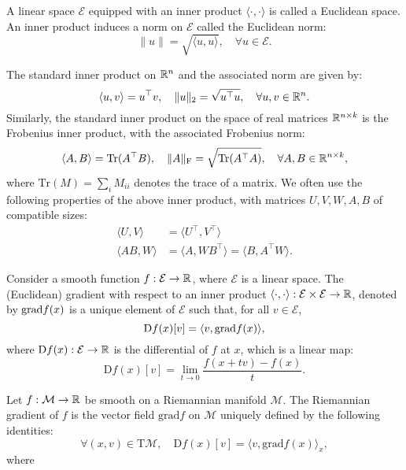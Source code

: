 \begin{definition}
    A linear space $\mathcal{E}$ equipped with an inner product $\langle \cdot, \cdot \rangle$ is called a Euclidean space. An inner product induces a norm on $\mathcal{E}$ called the Euclidean norm:
    \[
        \lVert u \rVert = \sqrt{\langle u, u \rangle}, \quad \forall u \in \mathcal{E}.
    \]
\end{definition}
The standard inner product on $\mathbb{R}^n$ and the associated norm are given by:
\begin{equation}\label{eq:std_inner}
    \langle u, v \rangle = u^\top v, \quad \lVert u \rVert_2 = \sqrt{u^\top u}, \quad \forall u,v \in \mathbb{R}^n.
\end{equation}
Similarly, the standard inner product on the space of real matrices $\mathbb{R}^{n \times k}$ is the Frobenius inner product, with the associated Frobenius norm:
\begin{equation}\label{eq:fro_inner}
    \langle A, B \rangle = \textrm{Tr}(A^\top B), \quad \lVert A \rVert_{\mathrm{F}} = \sqrt{\textrm{Tr}(A^\top A)}, \quad \forall A,B \in \mathbb{R}^{n \times k},
\end{equation}
where $\textrm{Tr}(M) = \sum_{i} M_{ii}$ denotes the trace of a matrix. We often use the following properties of the above inner product, with matrices $U, V, W, A, B$ of compatible sizes:
\begin{equation}
    \begin{split}
        \langle U, V  \rangle &= \langle U^\top, V^\top \rangle \\
        \langle A B, W \rangle &= \langle A, W B^\top \rangle = \langle B, A^\top W \rangle.
    \end{split}
\end{equation}

\begin{definition}[Gradient]
    Consider a smooth function $f: \mathcal{E} \to \mathbb{R}$, where $\mathcal{E}$ is a linear space. The (Euclidean) gradient with respect to an inner product $\langle \cdot, \cdot \rangle: \mathcal{E} \times \mathcal{E} \to \mathbb{R}$, denoted by $\mathrm{grad }{f}(x)$ is a unique element of $\mathcal{E}$ such that, for all $v \in \mathcal{E}$, 
    \[
        \textrm{D}f(x)[v] = \langle v, \mathrm{grad }{f}(x) \rangle,
    \]
    where $\textrm{D}f(x) : \mathcal{E} \to \mathbb{R}$ is the differential of $f$ at $x$, which is a linear map:
    \[
        \textrm{D}f(x)[v] = \lim_{t \to 0} \frac{f(x + tv) - f(x)}{t}.
    \]
\end{definition}

\begin{definition}
    Let $f : \mathcal{M} \to \mathbb{R}$ be smooth on a Riemannian manifold $\mathcal{M}$. The Riemannian gradient of $f$ is the vector field $\textrm{grad}f$ on $\mathcal{M}$ uniquely defined by the following identities:
    \[
        \forall (x,v) \in \textrm{T}\mathcal{M}, \quad \textrm{D}f(x)[v] = \langle v, \textrm{grad}f(x) \rangle_x,
    \]
    where 
\end{definition}